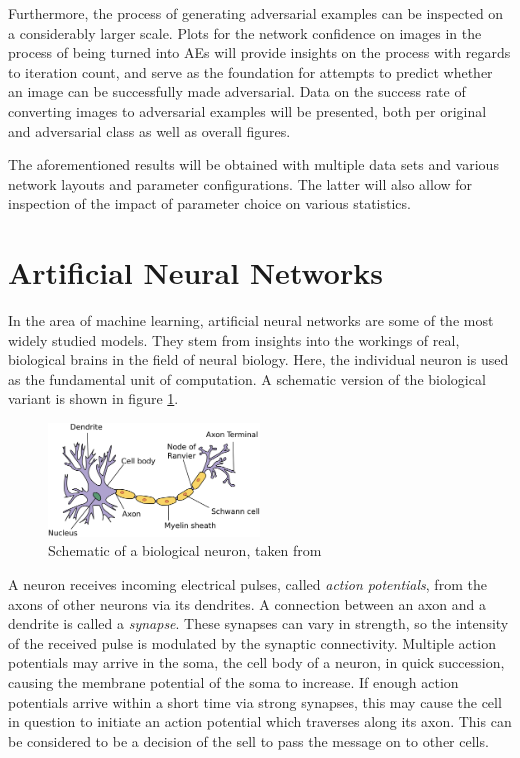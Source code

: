 \documentclass[11pt, a4paper]{article}
\begin{document}
Furthermore, the process of generating adversarial examples can be inspected on a considerably larger scale. Plots for the network confidence on images in the process of being turned into AEs will provide insights on the process with regards to iteration count, and serve as the foundation for attempts to predict whether an image can be successfully made adversarial. Data on the success rate of converting images to adversarial examples will be presented, both per original and adversarial class as well as overall figures.

The aforementioned results will be obtained with multiple data sets and various network layouts and parameter configurations. The latter will also allow for inspection of the impact of parameter choice on various statistics.


\newpage
\section{Artificial Neural Networks}
In the area of machine learning, artificial neural networks are some of the most widely studied models. They stem from insights into the workings of real, biological brains in the field of neural biology. Here, the individual neuron is used as the fundamental unit of computation. A schematic version of the biological variant is shown in figure \ref{fig:biological-neuron-schematic}.

\begin{figure}[htp]
	\centering
	\includegraphics[width=0.5\textwidth]{images/biological_neuron.png}
	\caption{Schematic of a biological neuron, taken from \cite{biological-neuron-schematic}}
	\label{fig:biological-neuron-schematic}
\end{figure}

A neuron receives incoming electrical pulses, called \emph{action potentials}, from the axons of other neurons via its dendrites. A connection between an axon and a dendrite is called a \emph{synapse}. These synapses can vary in strength, so the intensity of the received pulse is modulated by the synaptic connectivity. Multiple action potentials may arrive in the soma, the cell body of a neuron, in quick succession, causing the membrane potential of the soma to increase. If enough action potentials arrive within a short time via strong synapses, this may cause the cell in question to initiate an action potential which traverses along its axon. This can be considered to be a decision of the sell to pass the message on to other cells.
\end{document}
